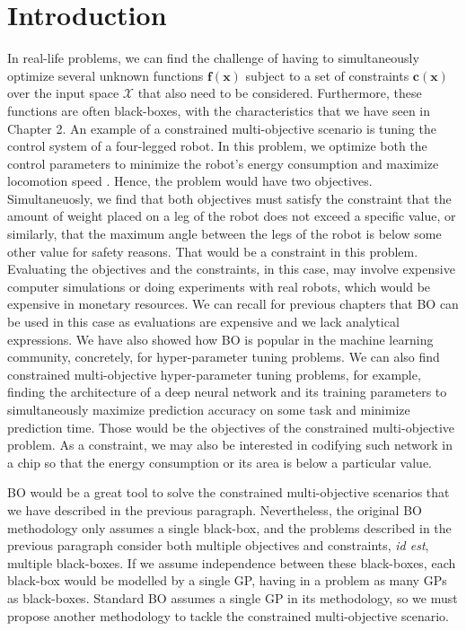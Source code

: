 \section{Introduction}
In real-life problems, we can find the challenge of having to simultaneously optimize several unknown functions $\mathbf{f}(\mathbf{x})$ subject to a set of constraints $\mathbf{c}(\mathbf{x})$ over the input space $\mathcal{X}$ that also need to be considered. Furthermore, these functions are often black-boxes, with the characteristics that we have seen in Chapter 2. An example of a constrained multi-objective scenario is tuning the control system of a four-legged robot. In this problem, we optimize both the control parameters to minimize the robot's energy consumption and maximize locomotion speed \citep{ariizumi:2014}. Hence, the problem would have two objectives. Simultaneuosly, we find that both objectives must satisfy the constraint that the amount of weight placed on a leg of the robot does not exceed a specific value, or similarly, that the maximum angle between the legs of the robot is below some other value for safety reasons. That would be a constraint in this problem. Evaluating the objectives and the constraints, in this case, may involve expensive computer simulations or doing experiments with real robots, which would be expensive in monetary resources. We can recall for previous chapters that BO can be used in this case as evaluations are expensive and we lack analytical expressions. We have also showed how BO is popular in the machine learning community, concretely, for hyper-parameter tuning problems. We can also find constrained multi-objective hyper-parameter tuning problems, for example, finding the architecture of a deep neural network and its training parameters to simultaneously maximize prediction accuracy on some task and minimize prediction time. Those would be the objectives of the constrained multi-objective problem. As a constraint, we may also be interested in codifying such network in a chip so that the energy consumption or its area is below a particular value.

BO would be a great tool to solve the constrained multi-objective scenarios that we have described in the previous paragraph. Nevertheless, the original BO methodology only assumes a single black-box, and the problems described in the previous paragraph consider both multiple objectives and constraints, \textit{id est}, multiple black-boxes. If we assume independence between these black-boxes, each black-box would be modelled by a single GP, having in a problem as many GPs as black-boxes. Standard BO assumes a single GP in its methodology, so we must propose another methodology to tackle the constrained multi-objective scenario.

